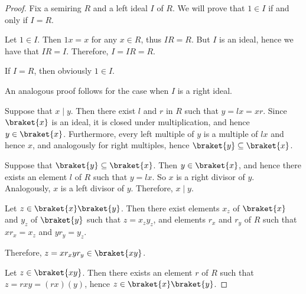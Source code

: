 \begin{proof}
   Fix a semiring \( R \) and a left ideal \( I \) of \( R \). We will prove that \( 1 \in I \) if and only if \( I = R \).

  \SufficiencySubProof* Let \( 1 \in I \). Then \( 1x = x \) for any \( x \in R \), thus \( IR = R \). But \( I \) is an ideal, hence we have that \( IR = I \). Therefore, \( I = IR = R \).

  \NecessitySubProof* If \( I = R \), then obviously \( 1 \in I \).

  An analogous proof follows for the case when \( I \) is a right ideal.


  \SufficiencySubProof* Suppose that \( x \mid y \). Then there exist \( l \) and \( r \) in \( R \) such that \( y = lx = xr \). Since \( \braket{x} \) is an ideal, it is closed under multiplication, and hence \( y \in \braket{x} \). Furthermore, every left multiple of \( y \) is a multiple of \( lx \) and hence \( x \), and analogously for right multiples, hence \( \braket{y} \subseteq \braket{x} \).

  \NecessitySubProof* Suppose that \( \braket{y} \subseteq \braket{x} \). Then \( y \in \braket{x} \), and hence there exists an element \( l \) of \( R \) such that \( y = lx \). So \( x \) is a right divisor of \( y \). Analogously, \( x \) is a left divisor of \( y \). Therefore, \( x \mid y \).

   \hfill
  \SufficiencySubProof* Let \( z \in \braket{x} \braket{y} \). Then there exist elements \( x_z \) of \( \braket{x} \) and \( y_z \) of \( \braket{y} \) such that \( z = x_z y_z \), and elements \( r_x \) and \( r_y \) of \( R \) such that \( x r_x = x_z \) and \( y r_y = y_z \).

  Therefore, \( z = x r_x y r_y \in \braket{xy} \).

  \NecessitySubProof* Let \( z \in \braket{xy} \). Then there exists an element \( r \) of \( R \) such that \( z = rxy = (rx)(y) \), hence \( z \in \braket{x} \braket{y} \).
\end{proof}

